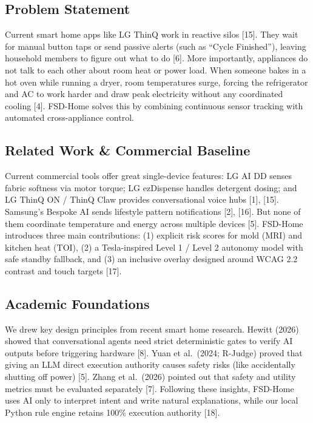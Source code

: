 \documentclass[conference]{IEEEtran}
\begin{document}
\subsection{Problem Statement}
Current smart home apps like LG ThinQ work in reactive silos [15]. They wait for
manual button taps or send passive alerts (such as ``Cycle Finished''), leaving
household members to figure out what to do [6]. More importantly, appliances do
not talk to each other about room heat or power load. When someone bakes in a hot
oven while running a dryer, room temperatures surge, forcing the refrigerator and
AC to work harder and draw peak electricity without any coordinated cooling [4].
FSD-Home solves this by combining continuous sensor tracking with automated
cross-appliance control.

\subsection{Related Work \& Commercial Baseline}
Current commercial tools offer great single-device features: LG AI DD\texttrademark{}
senses fabric softness via motor torque; LG ezDispense\texttrademark{} handles
detergent dosing; and LG ThinQ ON / ThinQ Claw provides conversational voice hubs
[1], [15]. Samsung's Bespoke AI sends lifestyle pattern notifications [2], [16].
But none of them coordinate temperature and energy across multiple devices [5].
FSD-Home introduces three main contributions: (1) explicit risk scores for mold
(MRI) and kitchen heat (TOI), (2) a Tesla-inspired Level 1 / Level 2 autonomy
model with safe standby fallback, and (3) an inclusive overlay designed around
WCAG 2.2 contrast and touch targets [17].

\subsection{Academic Foundations}
We drew key design principles from recent smart home research. Hewitt (2026)
showed that conversational agents need strict deterministic gates to verify AI
outputs before triggering hardware [8]. Yuan et al.\ (2024; R-Judge) proved that
giving an LLM direct execution authority causes safety risks (like accidentally
shutting off power) [5]. Zhang et al.\ (2026) pointed out that safety and utility
metrics must be evaluated separately [7]. Following these insights, FSD-Home uses
AI only to interpret intent and write natural explanations, while our local
Python rule engine retains 100\% execution authority [18].
\end{document}
